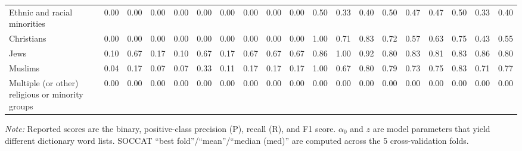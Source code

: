 \begin{table}[htb]
\begin{threeparttable}
\begin{tabular}{l ccc ccc ccc ccc ccc ccc}
\shortstack[l]{Ethnic and racial\\[-3pt]minorities} & 0.00 & 0.00 & 0.00 & 0.00 & 0.00 & 0.00 & 0.00 & 0.00 & 0.00 & 0.50 & 0.33 & 0.40 & 0.50 & 0.47 & 0.47 & 0.50 & 0.33 & 0.40 \\
Christians & 0.00 & 0.00 & 0.00 & 0.00 & 0.00 & 0.00 & 0.00 & 0.00 & 0.00 & 1.00 & 0.71 & 0.83 & 0.72 & 0.57 & 0.63 & 0.75 & 0.43 & 0.55 \\
Jews & 0.10 & 0.67 & 0.17 & 0.10 & 0.67 & 0.17 & 0.67 & 0.67 & 0.67 & 0.86 & 1.00 & 0.92 & 0.80 & 0.83 & 0.81 & 0.83 & 0.86 & 0.80 \\
Muslims & 0.04 & 0.17 & 0.07 & 0.07 & 0.33 & 0.11 & 0.17 & 0.17 & 0.17 & 1.00 & 0.67 & 0.80 & 0.79 & 0.73 & 0.75 & 0.83 & 0.71 & 0.77 \\
\shortstack[l]{Multiple (or other)\\[-3pt]religious or minority groups} & 0.00 & 0.00 & 0.00 & 0.00 & 0.00 & 0.00 & 0.00 & 0.00 & 0.00 & 0.00 & 0.00 & 0.00 & 0.00 & 0.00 & 0.00 & 0.00 & 0.00 & 0.00 \\
\bottomrule
\end{tabular}
\begin{tablenotes}[flushleft]
\footnotesize
\item \textit{Note:} Reported scores are the binary, positive-class precision (P), recall (R), and F1 score. $\alpha_0$ and $z$ are model parameters that yield different dictionary word lists. SOCCAT ``best fold''/``mean''/``median (med)'' are computed across the 5 cross-validation folds.
\end{tablenotes}
\end{threeparttable}
\end{table}